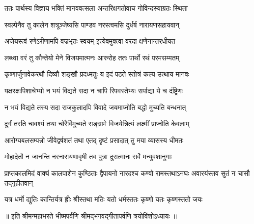 
\twolineshloka
{ततः पार्थस्य विज्ञाय भक्तिं मानववत्सला}
{अन्तरिक्षगतोवाच गोविन्दस्याग्रतः स्थिता}


\twolineshloka
{स्वल्पेनैव तु कालेन शत्रूञ्जेष्यसि पाण्डव}
{नरस्त्वमसि दुर्धर्ष नारायणसहायवान्}

\twolineshloka
{अजेयस्त्वं रणेऽरीणामपि वज्रभृतः स्वयम्}
{इत्येवमुक्त्वा वरदा क्षणेनान्तरधीयत}

\twolineshloka
{लब्ध्वा वरं तु कौन्तेयो मेने विजयमात्मनः}
{आरुरोह ततः पार्थो रथं परमसम्मतम्}

\twolineshloka
{कृष्णार्जुनावेकरथौ दिव्यौ शङ्खौ प्रदध्मतुः}
{य इदं पठते स्तोत्रं कल्य उत्थाय मानवः}

\twolineshloka
{यक्षरक्षःपिशाचेभ्यो न भयं विद्यते सदा}
{न चापि रिपवस्तेभ्यः सर्पाद्या ये च दंष्ट्रिणः}

\twolineshloka
{न भयं विद्यते तस्य सदा राजकुलादपि}
{विवादे जयमाप्नोति बद्धो मुच्यति बन्धनात्}

\twolineshloka
{दुर्गं तरति चावश्यं तथा चोरैर्विमुच्यते}
{सङ्ग्रामे विजयेन्नित्यं लक्ष्मीं प्राप्नोति केवलाम्}

\twolineshloka
{आरोग्यबलसम्पन्नो जीवेद्वर्षशतं तथा}
{एतद् दृष्टं प्रसादात् तु मया व्यासस्य धीमतः}

\twolineshloka
{मोहादेतौ न जानन्ति नरनारायणावृषी}
{तव पुत्रा दुरात्मानः सर्वे मन्युवशानुगाः}


\threelineshloka
{प्राप्तकालमिदं वाक्यं कालपाशेन कुण्ठिताः}
{द्वैपायनो नारदश्च कण्वो रामस्तथाऽनघः}
{अवारयंस्तव सुतं न चासौ तद्गृहीतवान्}

\twolineshloka
{यत्र धर्मो द्युतिः कान्तिर्यत्र ह्रीः श्रीस्तथा मतिः}
{यतो धर्मस्ततः कृष्णो यतः कृष्णस्ततो जयः}

॥ इति श्रीमन्महाभरते भीष्मपर्वणि श्रीमद्भगवद्गीतापर्वणि
त्रयोविंशोऽध्यायः ॥

